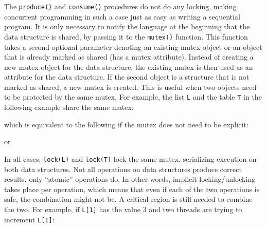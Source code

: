 
The \texttt{produce()} and \texttt{consume()} procedures do not do any locking,
making concurrent programming in such a case just as easy as writing a
sequential program. It is only necessary to notify the language at the beginning
that the data structure is shared, by passing it to the \texttt{mutex()}
function. This function takes a second optional parameter denoting an existing
mutex object or an object that is already marked as shared (has a mutex
attribute).  Instead of creating a new mutex object for the data structure, the
existing mutex is then used as an attribute for the data structure. If the second
object is a structure that is not marked as shared, a new mutex is created. This
is useful when two objects need to be protected by the same mutex. For example,
the list \texttt{L} and the table \texttt{T} in the following example share the
same mutex:


which is equivalent to the following if the mutex does not need to be explicit:


or


In all cases, \texttt{lock(L)} and \texttt{lock(T)} lock the same mutex,
serializing execution on both data structures. Not all operations on data
structures produce correct results, only ``atomic'' operations do. In other
words, implicit locking/unlocking takes place per operation, which means that
even if each of the two operations is safe, the combination might not be. A
critical region is still needed to combine the two.  For example, if
\texttt{L[1]} has the value 3 and two threads are trying to increment
\texttt{L[1]}:

